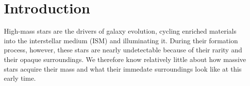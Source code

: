 \documentclass{aa}
\begin{document}
%

\section{Introduction}
High-mass stars are the drivers of galaxy evolution, cycling enriched materials
into the interstellar medium (ISM) and illuminating it.  During their formation
process, however, these stars are nearly undetectable because of their rarity
and their opaque surroundings.  We therefore know relatively little about how
massive stars acquire their mass and what their immedate surroundings look like
at this early time.
\end{document}
